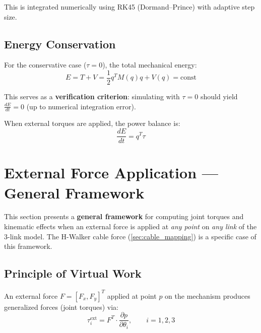 \documentclass[11pt,a4paper]{article}
\newcommand{\vc}[1]{\bm{#1}}
\newcommand{\mat}[1]{\bm{#1}}
\newcommand{\dt}[1]{\dot{#1}}
\newcommand{\pder}[2]{\frac{\partial #1}{\partial #2}}
\def\vc#1{#1}%
\def\mat#1{#1}%
\def\dt#1{#1}%
\def\bm#1{#1}%
\begin{document}
This is integrated numerically using RK45 (Dormand--Prince) with adaptive step size.

\subsection{Energy Conservation}

For the conservative case ($\vc{\tau} = \vc{0}$), the total mechanical energy:
\begin{equation}
    E = T + V = \frac{1}{2}\dt{\vc{q}}^T \mat{M}(\vc{q})\dt{\vc{q}} + V(\vc{q}) = \text{const}
    \label{eq:energy_conservation}
\end{equation}

This serves as a \textbf{verification criterion}: simulating with $\vc{\tau}=\vc{0}$
should yield $\frac{dE}{dt} = 0$ (up to numerical integration error).

When external torques are applied, the power balance is:
\begin{equation}
    \frac{dE}{dt} = \dt{\vc{q}}^T \vc{\tau}
    \label{eq:power_balance}
\end{equation}

\section{External Force Application --- General Framework}
\label{sec:external_force}

This section presents a \textbf{general framework} for computing joint torques
and kinematic effects when an external force is applied at \textit{any point}
on \textit{any link} of the 3-link model. The H-Walker cable force
(\cref{sec:cable_mapping}) is a specific case of this framework.

\subsection{Principle of Virtual Work}

An external force $\vc{F} = [F_x, F_y]^T$ applied at point $\vc{p}$ on the
mechanism produces generalized forces (joint torques) via:
\begin{equation}
\boxed{
    \tau_i^{\text{ext}} = \vc{F}^T \cdot \pder{\vc{p}}{\theta_i}, \qquad i = 1, 2, 3
}
\label{eq:virtual_work_general}
\end{equation}
\end{document}
